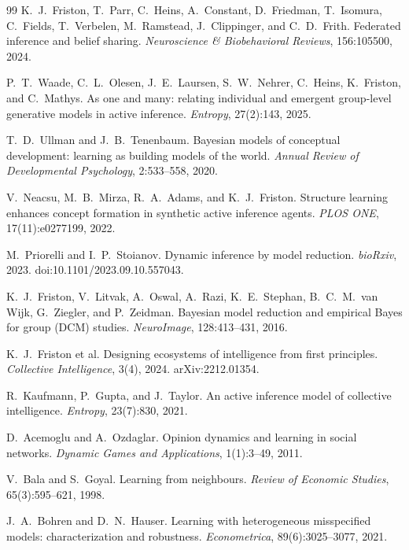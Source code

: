 \documentclass[runningheads]{llncs}
\begin{document}
\begin{thebibliography}{99}
K.~J.~Friston, T.~Parr, C.~Heins, A.~Constant, D.~Friedman, T.~Isomura, C.~Fields,
T.~Verbelen, M.~Ramstead, J.~Clippinger, and C.~D.~Frith.
Federated inference and belief sharing.
\emph{Neuroscience \& Biobehavioral Reviews}, 156:105500, 2024.

P.~T.~Waade, C.~L.~Olesen, J.~E.~Laursen, S.~W.~Nehrer, C.~Heins, K.~Friston, and C.~Mathys.
As one and many: relating individual and emergent group-level generative models in active inference.
\emph{Entropy}, 27(2):143, 2025.

T.~D.~Ullman and J.~B.~Tenenbaum.
Bayesian models of conceptual development: learning as building models of the world.
\emph{Annual Review of Developmental Psychology}, 2:533--558, 2020.

V.~Neacsu, M.~B.~Mirza, R.~A.~Adams, and K.~J.~Friston.
Structure learning enhances concept formation in synthetic active inference agents.
\emph{PLOS ONE}, 17(11):e0277199, 2022.

M.~Priorelli and I.~P.~Stoianov.
Dynamic inference by model reduction.
\emph{bioRxiv}, 2023. doi:10.1101/2023.09.10.557043.

K.~J.~Friston, V.~Litvak, A.~Oswal, A.~Razi, K.~E.~Stephan, B.~C.~M.~van Wijk, G.~Ziegler, and
P.~Zeidman. Bayesian model reduction and empirical {Bayes} for group ({DCM}) studies.
\emph{NeuroImage}, 128:413--431, 2016.

K.~J.~Friston et al.
Designing ecosystems of intelligence from first principles.
\emph{Collective Intelligence}, 3(4), 2024. arXiv:2212.01354.

R.~Kaufmann, P.~Gupta, and J.~Taylor.
An active inference model of collective intelligence.
\emph{Entropy}, 23(7):830, 2021.

D.~Acemoglu and A.~Ozdaglar.
Opinion dynamics and learning in social networks.
\emph{Dynamic Games and Applications}, 1(1):3--49, 2011.

V.~Bala and S.~Goyal.
Learning from neighbours. \emph{Review of Economic Studies}, 65(3):595--621, 1998.

J.~A.~Bohren and D.~N.~Hauser.
Learning with heterogeneous misspecified models: characterization and robustness.
\emph{Econometrica}, 89(6):3025--3077, 2021.


\end{thebibliography}
\end{document}
